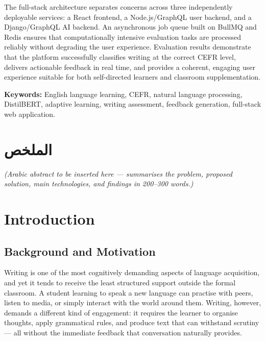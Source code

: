 \documentclass[12pt, a4paper]{report}
\begin{document}
The full-stack architecture separates concerns across three independently deployable services: a React frontend, a Node.js/GraphQL user backend, and a Django/GraphQL AI backend. An asynchronous job queue built on BullMQ and Redis ensures that computationally intensive evaluation tasks are processed reliably without degrading the user experience. Evaluation results demonstrate that the platform successfully classifies writing at the correct CEFR level, delivers actionable feedback in real time, and provides a coherent, engaging user experience suitable for both self-directed learners and classroom supplementation.

\textbf{Keywords:} English language learning, CEFR, natural language processing, DistilBERT, adaptive learning, writing assessment, feedback generation, full-stack web application.

\newpage

\chapter*{الملخص}

\begin{flushright}
\textit{(Arabic abstract to be inserted here — summarises the problem, proposed solution, main technologies, and findings in 200–300 words.)}
\end{flushright}

\newpage

\tableofcontents
\newpage
\listoffigures
\newpage
\listoftables
\newpage

\setcounter{page}{1}

\chapter{Introduction}

\section{Background and Motivation}

Writing is one of the most cognitively demanding aspects of language acquisition, and yet it tends to receive the least structured support outside the formal classroom. A student learning to speak a new language can practise with peers, listen to media, or simply interact with the world around them. Writing, however, demands a different kind of engagement: it requires the learner to organise thoughts, apply grammatical rules, and produce text that can withstand scrutiny — all without the immediate feedback that conversation naturally provides.
\end{document}
